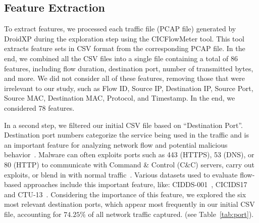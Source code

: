 
\subsection{Feature Extraction}\label{sec:feature}

To extract features, we processed each traffic file (PCAP file) generated by DroidXP during the exploration step using the CICFlowMeter tool. This tool extracts feature sets in CSV format from the corresponding PCAP file. In the end, we combined all the CSV files into a single file containing a total of 86 features, including flow duration, destination port, number of transmitted bytes, and more. We did not consider all of these features, removing those that were irrelevant to our study, such as Flow ID, Source IP, Destination IP, Source Port, Source MAC, Destination MAC, Protocol, and Timestamp. In the end, we considered 78 features.


In a second step, we filtered our initial CSV file based on ``Destination Port''. Destination port numbers categorize the service being used in the traffic and is an important feature for analyzing network flow and potential malicious behavior~\cite{DBLP:journals/compsec/UmerSB17,DBLP:journals/comsur/SperottoSSMPS10}. Malware can often exploits ports such as 443 (HTTPS), 53 (DNS), or 80 (HTTP) to communicate with Command \& Control (C\&C) servers, carry out exploits, or blend in with normal traffic~\cite{DBLP:journals/comsur/SperottoSSMPS10}. Various datasets used to evaluate flow-based approaches include this important feature, like: CIDDS-001~\cite{Ring2017FlowbasedBD}, CICIDS17~\cite{DBLP:conf/icict/MahfouzVS19} and CTU-13~\cite{DBLP:journals/compsec/GarciaGSZ14}. Considering the importance of this feature, we explored the six most relevant destination ports, which appear most frequently in our initial CSV file, accounting for $74.25\%$ of all network traffic captured. (see Table~\ref{tab:port}).

